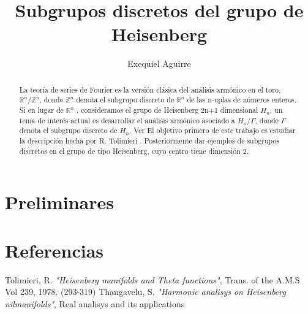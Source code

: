 \documentclass[12pt]{article}
\author{Exequiel Aguirre}
\title{Subgrupos discretos del grupo de Heisenberg }
\date{}
\begin{document}
\maketitle

\begin{abstract}
La teoría de series de Fourier es la versión clásica del análisis armónico en el toro,
$\mathbb{R}^n /\mathbb{Z}^n$, donde $\mathbb{Z}^n$ denota el subgrupo discreto de $\mathbb{R}^n$ de
las n-uplas de números enteros.\newline
Si en lugar de $\mathbb{R}^n$ , consideramos el grupo de Heisenberg 2n+1 dimensional $H_n$, un tema
de interés actual es desarrollar el análisis armónico asociado a $H_n/\Gamma$, donde $\Gamma$ 
denota el subgrupo discreto de $H_n$. Ver \cite{Th} \newline
El objetivo primero de este trabajo es estudiar la descripción hecha por R. Tolimieri \cite{To}.
Posteriormente dar ejemplos de subgrupos discretos en el grupo de tipo Heisenberg, cuyo centro tiene
dimensión 2.

\end{abstract}


 

\section{Preliminares}


 \section{Referencias}
  \begin{thebibliography}{1}
   Tolimieri, R.   \emph{"Heisenberg manifolds and Theta functions"}, Trans. of the A.M.S Vol 239, 1978. (293-319)
   Thangavelu, S.  \emph{"Harmonic analisys on Heisenberg nilmanifolds"}, Real analisys and its applications
  \end{thebibliography}
\end{document}
